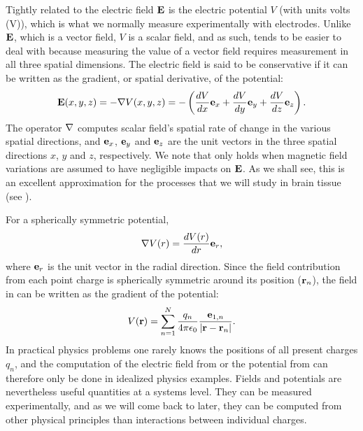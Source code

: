 Tightly related to the electric field ${\bf E}$ is the electric potential $V$ (with units volts (\si{\volt})), which is what we normally measure experimentally with electrodes. Unlike ${\bf E}$, which is a vector field, $V$ is a scalar field, and as such, tends to be easier to deal with because measuring the value of a vector field requires measurement in all three spatial dimensions. The electric field is said to be conservative if it can be written as the gradient, or spatial derivative, of the potential:
\begin{equation}
{\bf E}(x,y,z) = - {\bf \nabla} V(x,y,z) = - \left(\frac{dV}{dx} {\bf e}_x  + \frac{dV}{dy} {\bf e}_y + \frac{dV}{dz} {\bf e}_z \right).
\label{eq:Basics:EV}
\end{equation}
The operator ${\bf \nabla}$ computes scalar field's spatial rate of change in the various spatial directions, and ${\bf e}_x$, ${\bf e}_y$ and  ${\bf e}_z$ are the unit vectors in the three spatial directions $x$, $y$ and $z$, respectively. We note that  only holds when magnetic field variations are assumed to have negligible impacts on ${\bf E}$. As we shall see, this is an excellent approximation for the processes that we will study in brain tissue (see 
).

For a spherically symmetric potential,
\begin{equation}
{\bf \nabla} V(r) = \frac{dV(r)}{dr} {\bf {e}}_r, 
\label{eq:Basics:SphericalNablaPhi}
\end{equation}
where ${\bf {e}}_r$ is the unit vector in the radial direction. Since the field contribution from each point charge is spherically symmetric around its position (${\bf r}_n$), the field in  can be written as the gradient of the potential:
\begin{equation}
{V}({\bf r}) = \sum_{n=1}^{N}  \frac{q_n}{4\pi \epsilon_0} \frac{{{\bf e}}_{1,n}}{|{\bf r}-{\bf r}_n|}.
\label{eq:Basics:CoulombPhiN}
\end{equation}
In practical physics problems one rarely knows the positions of all present charges $q_n$, and the computation of the electric field from  or the potential from  can therefore only be done in idealized physics examples. Fields and potentials are nevertheless useful quantities at a systems level. They can be measured experimentally, and as we will come back to later, they can be computed from other physical principles than
interactions between individual charges.


